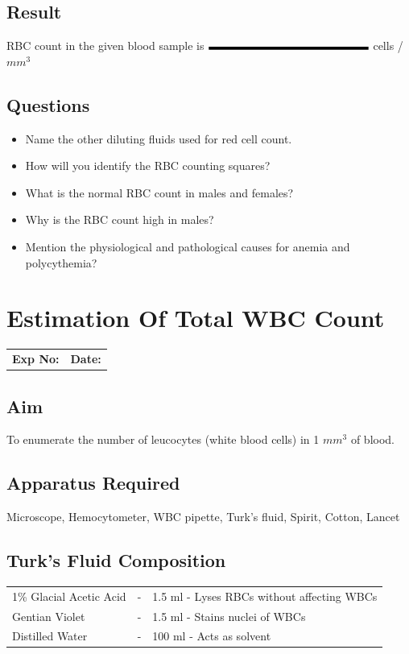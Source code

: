 \documentclass[a4paper,12pt]{book}
\begin{document}
\section*{Result}
RBC  count in the given  blood sample is $\rule{5cm}{0.1cm}$ cells / $mm^3$
\section*{Questions}
\begin{itemize}

	\item {Name the other diluting fluids used for red  cell count.}
	\item{How will you identify the RBC counting squares?}
	\item{What is the normal RBC count in males and females?}
	\item{Why is the RBC count high in males?}
	\item{Mention the physiological and pathological causes for anemia and polycythemia?}


\end{itemize}

\chapter*{\centering Estimation Of Total WBC Count}

		\begin{tabular}{p{5in} p{1in}}
			\textbf{Exp No:}  & \textbf{Date:}\\
		\end{tabular}
	\section *{Aim}
	To enumerate the number of leucocytes (white blood cells) in 1 $mm^3$ of blood.
	\section*{Apparatus Required}
Microscope, Hemocytometer, WBC pipette, Turk’s fluid, Spirit, Cotton, Lancet
	\section*{Turk's Fluid Composition}
\begin{tabular}{l c l}

	1\% Glacial Acetic Acid	&	-&	1.5 ml - Lyses RBCs without affecting WBCs\\
	Gentian Violet&			-&	1.5 ml - Stains nuclei of WBCs\\
	Distilled Water&		-&	100 ml - Acts as solvent\\

\end{tabular}
\end{document}
